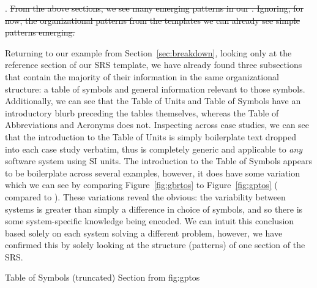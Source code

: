 . \sout{From the above sections, we see many emerging 
patterns 
in our \sfs{}. Ignoring, 
for now, the organizational patterns from the \smithea{} templates we can 
already see simple patterns emerging.}

Returning to our example from Section~\ref{sec:breakdown}, looking only at the 
reference section of our SRS template, we have already found
three subsections that contain the majority of their information in the same
organizational structure: a table of symbols and general information relevant 
to those symbols. Additionally, we can see that the Table of Units and Table of 
Symbols have an introductory blurb preceding the tables themselves, whereas the 
Table of Abbreviations and Acronyms does not. Inspecting across case studies, 
we can see that the introduction to the Table of Units is simply boilerplate 
text dropped into each case study verbatim, thus is completely generic and 
applicable to \emph{any} software system using SI units. The introduction to 
the Table of Symbols appears to be boilerplate across several examples, 
however, it does have some variation which we can see by comparing 
Figure~\ref{fig:gbrtos} to Figure~\ref{fig:gptos} (\gb{} compared to \gp{}).
These variations reveal the obvious: the variability between systems is greater 
than simply a difference in choice of symbols, and so there is some 
system-specific knowledge being encoded. We can intuit this conclusion based 
solely on each system solving a different problem, however, we have confirmed 
this by solely looking at the structure (patterns) of one section of the SRS.

{Table of Symbols (truncated) Section from \gp{}}
{fig:gptos}

